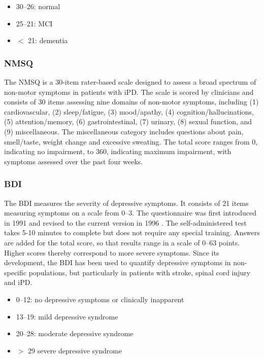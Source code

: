 \QScores{}
\begin{itemize}\itemsep2pt
\item 30--26: normal
\item 25--21: \ac{MCI}
\item $<$ 21: dementia
\end{itemize}

\QPsychometrics{}

\subsubsection{\acf{NMSQ}}
\label{questionnaires:NMSQ}
The \ac{NMSQ} is a 30-item rater-based scale designed to assess a broad spectrum of non-motor symptoms in patients with \ac{iPD}.
The scale is scored by clinicians and consists of 30 items assessing nine domains of non-motor symptoms, including (1) cardiovascular, (2) sleep/fatigue, (3) mood/apathy, (4) cognition/hallucinations, (5) attention/memory, (6) gastrointestinal, (7) urinary, (8) sexual function, and (9) miscellaneous. The miscellaneous category includes questions about pain, smell/taste, weight change and excessive sweating. The total score ranges from 0, indicating no impairment, to 360, indicating maximum impairment, with symptoms assessed over the past four weeks. 

\subsubsection{\acf{BDI}}
\label{questionnaires:BDI}

The \acl{BDI} measures the severity of depressive symptoms. It consists of 21 items  measuring symptoms on a scale from 0--3. The questionnaire was first introduced in 1991 \cite{beck1987bdi1} and revised to the current version in 1996 \cite{beck1996bdi2}. The self-administered test takes 5-10 minutes to complete but does not require any special training. Answers are added for the total score, so that results range in a scale of 0--63 points. Higher scores thereby correspond to more severe symptoms. Since its development, the \ac{BDI} has been used to quantify depressive symptoms in non-specific populations, but particularly in patients with stroke, spinal cord injury and \ac{iPD}. 

\QScores{}
\begin{itemize}\itemsep2pt
\item 0--12: no depressive symptoms or clinically inapparent
\item 13--19: mild depressive syndrome
\item 20--28: moderate depressive syndrome
\item $>$ 29 severe depressive syndrome
\end{itemize}

